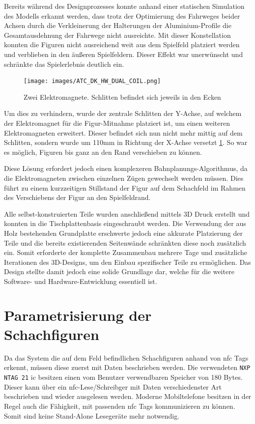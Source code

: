 Bereits während des Designprozesses konnte anhand einer statischen
Simulation des Modells erkannt werden, dass trotz der Optimierung des
Fahrweges beider Achsen durch die Verkleinerung der Halterungen der
Aluminium-Profile die Gesamtausdehnung der Fahrwege nicht ausreichte.
Mit dieser Konstellation konnten die Figuren nicht ausreichend weit aus
dem Spielfeld platziert werden und verblieben in den äußeren
Spielfeldern. Dieser Effekt war unerwünscht und schränkte das
Spielerlebnis deutlich ein.

\begin{figure}
\centering
\texttt{[image: images/ATC\_DK\_HW\_DUAL\_COIL.png]}
\caption{Zwei Elektromagnete. Schlitten befindet sich jeweils in den
Ecken \label{ATC_DK_HW_DUAL_COIL}}
\end{figure}

Um dies zu verhindern, wurde der zentrale Schlitten der Y-Achse, auf
welchem der Elektromagnet für die Figur-Mitnahme platziert ist, um einen
weiteren Elektromagneten erweitert. Dieser befindet sich nun nicht mehr
mittig auf dem Schlitten, sondern wurde um 110mm in Richtung der X-Achse
versetzt \ref{ATC_DK_HW_DUAL_COIL}. So war es möglich, Figuren bis ganz
an den Rand verschieben zu können.

Diese Lösung erfordert jedoch einen komplexeren
Bahnplanungs-Algorithmus, da die Elektromagneten zwischen einzelnen
Zügen gewechselt werden müssen. Dies führt zu einem kurzzeitigen
Stillstand der Figur auf dem Schachfeld im Rahmen des Verschiebens der
Figur an den Spielfeldrand.

Alle selbst-konstruierten Teile wurden anschließend mittels 3D Druck
erstellt und konnten in die Tischplattenbasis eingeschraubt werden. Die
Verwendung der aus Holz bestehenden Grundplatte erschwerte jedoch eine
akkurate Platzierung der Teile und die bereits existierenden Seitenwände
schränkten diese noch zusätzlich ein. Somit erforderte der komplette
Zusammenbau mehrere Tage und zusätzliche Iterationen des 3D-Designs, um
den Einbau spezifischer Teile zu ermöglichen. Das Design stellte damit
jedoch eine solide Grundlage dar, welche für die weitere Software- und
Hardware-Entwicklung essentiell ist.

\hypertarget{parametrisierung-der-schachfiguren}{%
\section{Parametrisierung der
Schachfiguren}\label{parametrisierung-der-schachfiguren}}

Da das System die auf dem Feld befindlichen Schachfiguren anhand von
\gls{nfc} Tags erkennt, müssen diese zuerst mit Daten beschrieben
werden. Die verwendeten
\passthrough{\lstinline!NXP NTAG 21!}\cite{nxpntag21} \gls{ic}
besitzen einen vom Benutzer verwendbaren Speicher von 180 Bytes. Dieser
kann über ein \gls{nfc}-Lese/Schreibger mit Daten verschiedenster Art
beschrieben und wieder ausgelesen werden. Moderne Mobiltelefone besitzen
in der Regel auch die Fähigkeit, mit passenden \gls{nfc} Tags
kommunizieren zu können. Somit sind keine Stand-Alone Lesegeräte mehr
notwendig.

